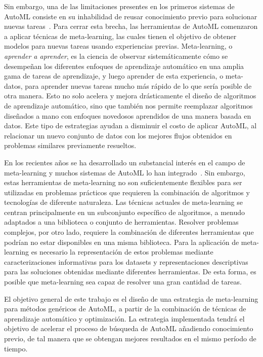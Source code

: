 \documentclass[a4paper,10pt,twocolumn]{article}
\begin{document}
Sin embargo, una de las limitaciones presentes en los primeros sistemas de AutoML consiste en su inhabilidad de reusar conocimiento previo para solucionar nuevas tareas~\cite{dyrmishi2019decision}. Para cerrar esta brecha, las herramientas de AutoML comenzaron a aplicar técnicas de meta-learning, las cuales tienen el objetivo de obtener modelos para nuevas tareas usando experiencias previas. Meta-learning, o \textit{aprender a aprender}, es la ciencia de observar sistemáticamente cómo se desempeñan los diferentes enfoques de aprendizaje automático en una amplia gama de tareas de aprendizaje, y luego aprender de esta experiencia, o meta-datos, para aprender nuevas tareas mucho más rápido de lo que sería posible de otra manera. Esto no solo acelera y mejora drásticamente el diseño de algoritmos de aprendizaje automático, sino que también nos permite reemplazar algoritmos diseñados a mano con enfoques novedosos aprendidos de una manera basada en datos. Este tipo de estrategias ayudan a disminuir el costo de aplicar AutoML, al relacionar un nuevo conjunto de datos con los mejores flujos obtenidos en problemas similares previamente resueltos. 

En los recientes años se ha desarrollado un substancial interés en el campo de meta-learning y muchos sistemas de AutoML lo han integrado~\cite{fuerer2015efficient, maher2019smartml, drori2018alphad3m, yang2018oboe, zimmer2021auto, Feurer2020AutoSklearn2T}. Sin embargo, estas herramientas de meta-learning no son suficientemente flexibles para ser utilizadas en problemas prácticos que requieren la combinación de algoritmos y tecnologías de diferente naturaleza. Las técnicas actuales de meta-learning se centran principalmente en un subconjunto específico de algoritmos, a menudo adaptados a una biblioteca o conjunto de herramientas. Resolver problemas complejos, por otro lado, requiere la combinación de diferentes herramientas que podrían no estar disponibles en una misma biblioteca. Para la aplicación de meta-learning es necesario la representación de estos problemas mediante caracterizaciones informativas para los datasets y representaciones descriptivas para las soluciones obtenidas mediante diferentes herramientas. De esta forma, es posible que meta-learning sea capaz de resolver una gran cantidad de tareas.

El objetivo general de este trabajo es el diseño de una estrategia de meta-learning para métodos genéricos de AutoML, a partir de la combinación de técnicas de aprendizaje automático y optimización. La estrategia implementada tendrá el objetivo de acelerar el proceso de búsqueda de AutoML añadiendo conocimiento previo, de tal manera que se obtengan mejores resultados en el mismo período de tiempo.
\end{document}
